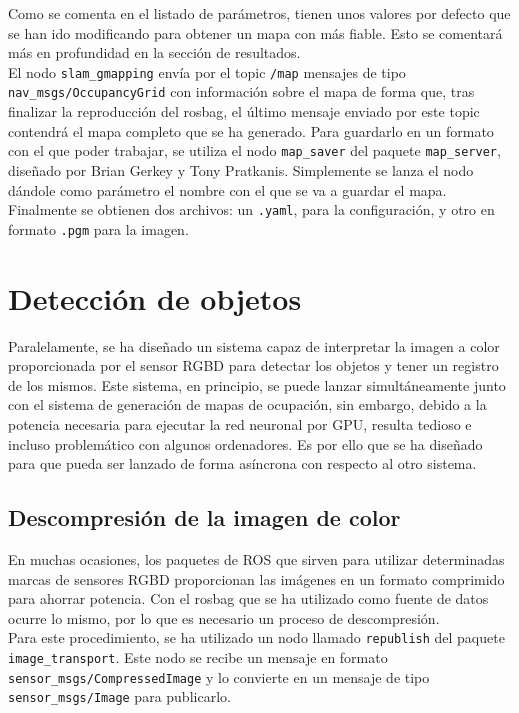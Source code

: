 Como se comenta en el listado de parámetros, tienen unos valores por defecto que se han ido modificando para obtener un mapa con más fiable. Esto se comentará más en profundidad en la sección de resultados.\\

El nodo \texttt{slam\_gmapping} envía por el topic \texttt{/map} mensajes de tipo \texttt{nav\_msgs\-/OccupancyGrid} con información sobre el mapa de forma que, tras finalizar la reproducción del rosbag, el último mensaje enviado por este topic contendrá el mapa completo que se ha generado. Para guardarlo en un formato con el que poder trabajar, se utiliza el nodo \texttt{map\_saver} del paquete \texttt{map\_server}, diseñado por Brian Gerkey y Tony Pratkanis. Simplemente se lanza el nodo dándole como parámetro el nombre con el que se va a guardar el mapa. Finalmente se obtienen dos archivos: un \texttt{.yaml}, para la configuración, y otro en formato \texttt{.pgm} para la imagen.\\

\section{Detección de objetos}

Paralelamente, se ha diseñado un sistema capaz de interpretar la imagen a color proporcionada por el sensor RGBD para detectar los objetos y tener un registro de los mismos. Este sistema, en principio, se puede lanzar simultáneamente junto con el sistema de generación de mapas de ocupación, sin embargo, debido a la potencia necesaria para ejecutar la red neuronal por GPU, resulta tedioso e incluso problemático con algunos ordenadores. Es por ello que se ha diseñado para que pueda ser lanzado de forma asíncrona con respecto al otro sistema.\\

\subsection{Descompresión de la imagen de color}

En muchas ocasiones, los paquetes de ROS que sirven para utilizar determinadas marcas de sensores RGBD proporcionan las imágenes en un formato comprimido para ahorrar potencia. Con el rosbag que se ha utilizado como fuente de datos ocurre lo mismo, por lo que es necesario un proceso de descompresión.\\

Para este procedimiento, se ha utilizado un nodo llamado \texttt{republish} del paquete \texttt{image\_transport}. Este nodo se recibe un mensaje en formato \texttt{sensor\_msgs/\-Compressed\-Image} y lo convierte en un mensaje de tipo \texttt{sensor\_msgs/Image} para publicarlo.\\

